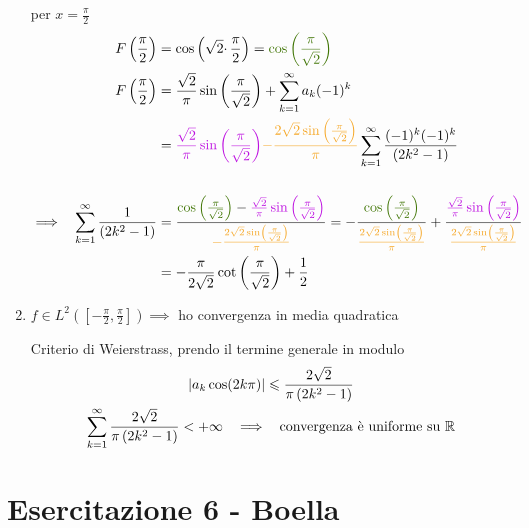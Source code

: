 \begin{enumerate}
per $x=\frac{\pi }{2}$\begin{equation*}
\begin{aligned}
F\left(\frac{\pi }{2}\right) & =\cos\left(\sqrt{2} \cdotp \frac{\pi }{2}\right) =\textcolor[rgb]{0.25,0.46,0.02}{\cos\left(\frac{\pi }{\sqrt{2}}\right)}\\
F\left(\frac{\pi }{2}\right) & =\frac{\sqrt{2}}{\pi }\sin\left(\frac{\pi }{\sqrt{2}}\right) +\sum\limits ^{\infty }_{k=1} a_{k}( -1)^{k}\\
 & =\textcolor[rgb]{0.74,0.06,0.88}{\frac{\sqrt{2}}{\pi }\sin\left(\frac{\pi }{\sqrt{2}}\right)}\textcolor[rgb]{0.96,0.65,0.14}{-\frac{2\sqrt{2}\sin\left(\frac{\pi }{\sqrt{2}}\right)}{\pi }}\sum\limits ^{\infty }_{k=1}\frac{( -1)^{k}( -1)^{k}}{\left( 2k^{2} -1\right)}\\
 & \\
\implies \ \ \sum\limits ^{\infty }_{k=1}\frac{1}{\left( 2k^{2} -1\right)} & =\frac{\textcolor[rgb]{0.25,0.46,0.02}{\cos\left(\frac{\pi }{\sqrt{2}}\right)} -\textcolor[rgb]{0.74,0.06,0.88}{\frac{\sqrt{2}}{\pi }\sin\left(\frac{\pi }{\sqrt{2}}\right)}}{\textcolor[rgb]{0.96,0.65,0.14}{-\frac{2\sqrt{2}\sin\left(\frac{\pi }{\sqrt{2}}\right)}{\pi }}} =-\frac{\textcolor[rgb]{0.25,0.46,0.02}{\cos\left(\frac{\pi }{\sqrt{2}}\right)}}{\textcolor[rgb]{0.96,0.65,0.14}{\frac{2\sqrt{2}\sin\left(\frac{\pi }{\sqrt{2}}\right)}{\pi }}} +\frac{\textcolor[rgb]{0.74,0.06,0.88}{\frac{\sqrt{2}}{\pi }\sin\left(\frac{\pi }{\sqrt{2}}\right)}}{\textcolor[rgb]{0.96,0.65,0.14}{\frac{2\sqrt{2}\sin\left(\frac{\pi }{\sqrt{2}}\right)}{\pi }}}\\
 & =-\frac{\pi }{2\sqrt{2}}\cot\left(\frac{\pi }{\sqrt{2}}\right) +\frac{1}{2}
\end{aligned}
\end{equation*}
\item $f\in L^{2}\left(\left[ -\frac{\pi }{2} ,\frac{\pi }{2}\right]\right) \implies $ ho convergenza in media quadratica

Criterio di Weierstrass, prendo il termine generale in modulo\begin{gather*}
| a_{k}\cos( 2k\pi )| \leqslant \frac{2\sqrt{2}}{\pi \left( 2k^{2} -1\right)}\\
\sum\limits ^{\infty }_{k=1}\frac{2\sqrt{2}}{\pi \left( 2k^{2} -1\right)} < +\infty \ \ \implies \ \ \text{convergenza è uniforme su} \ \mathbb{R} 
\end{gather*}
\end{enumerate}
\chapter{Esercitazione 6 - Boella}
\ParteEsercizi
\Esercizio{}


